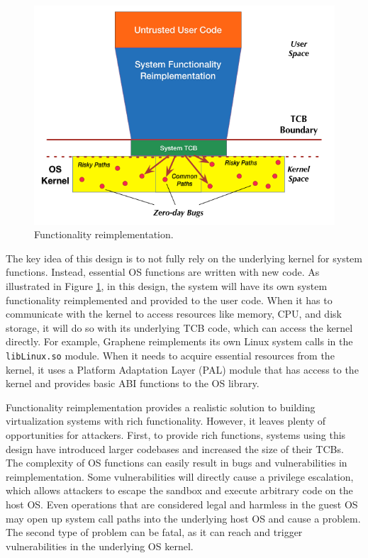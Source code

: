 \begin{figure}%
\centering
\includegraphics[width=1.0\columnwidth]{diagram/Virtualization_Design_Model_02.png}
\caption{\small Functionality reimplementation.}
\label{fig:design_functionality_reimplementation}
\end{figure}

The key idea of this design is to not fully rely on the underlying
kernel for system functions. Instead, essential OS functions are written with new
code. As illustrated in Figure \ref{fig:design_functionality_reimplementation},
in this design, the system will have its own system functionality reimplemented and
provided to the user code. When it has to communicate with the kernel
to access resources like memory, CPU, and disk storage, it will do so with
its underlying TCB code, which can access the kernel directly.
For example, Graphene \cite{Graphene-14} reimplements
its own Linux system calls in the
\texttt{libLinux.so} module. When it needs to acquire essential resources from
the kernel, it uses a
Platform Adaptation Layer (PAL)  module that has access to the kernel
and provides basic ABI functions to the OS library.

Functionality reimplementation provides a
realistic solution to building virtualization systems
with rich functionality. However, it
leaves plenty of opportunities for attackers.
First, to provide rich functions, systems using this design have
introduced larger codebases and increased the size of their TCBs.
The complexity of OS functions can easily result in bugs and vulnerabilities in
reimplementation. Some vulnerabilities
will directly cause a privilege escalation, which allows attackers to escape the sandbox
and execute arbitrary code on the host OS.
Even operations that are considered
legal and harmless in the guest OS may open up system call paths into the underlying
host OS and cause a problem.
The second type of problem can be fatal, as it can reach and
trigger vulnerabilities in the underlying OS kernel.

